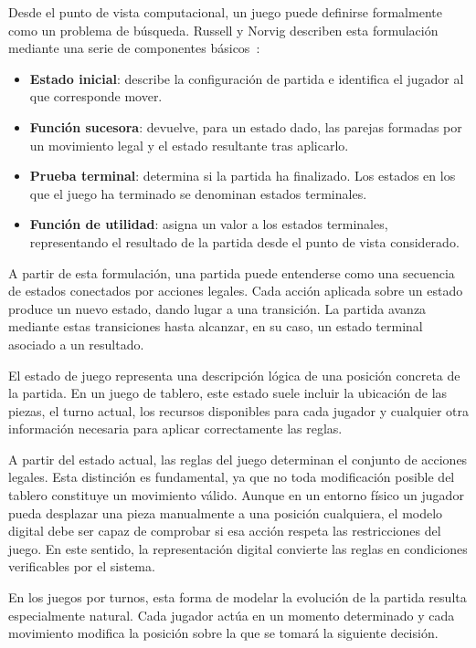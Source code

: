 Desde el punto de vista computacional, un juego puede definirse formalmente como un problema de búsqueda. Russell y Norvig describen esta formulación mediante una serie de componentes básicos~\cite{russell2020aima}:

\begin{itemize}
    \item \textbf{Estado inicial}: describe la configuración de partida e identifica el jugador al que corresponde mover.
    \item \textbf{Función sucesora}: devuelve, para un estado dado, las parejas formadas por un movimiento legal y el estado resultante tras aplicarlo.
    \item \textbf{Prueba terminal}: determina si la partida ha finalizado. Los estados en los que el juego ha terminado se denominan estados terminales.
    \item \textbf{Función de utilidad}: asigna un valor a los estados terminales, representando el resultado de la partida desde el punto de vista considerado.
\end{itemize}

A partir de esta formulación, una partida puede entenderse como una secuencia de estados conectados por acciones legales. Cada acción aplicada sobre un estado produce un nuevo estado, dando lugar a una transición. La partida avanza mediante estas transiciones hasta alcanzar, en su caso, un estado terminal asociado a un resultado.

El estado de juego representa una descripción lógica de una posición concreta de la partida. En un juego de tablero, este estado suele incluir la ubicación de las piezas, el turno actual, los recursos disponibles para cada jugador y cualquier otra información necesaria para aplicar correctamente las reglas.

A partir del estado actual, las reglas del juego determinan el conjunto de acciones legales. Esta distinción es fundamental, ya que no toda modificación posible del tablero constituye un movimiento válido. Aunque en un entorno físico un jugador pueda desplazar una pieza manualmente a una posición cualquiera, el modelo digital debe ser capaz de comprobar si esa acción respeta las restricciones del juego. En este sentido, la representación digital convierte las reglas en condiciones verificables por el sistema.

En los juegos por turnos, esta forma de modelar la evolución de la partida resulta especialmente natural. Cada jugador actúa en un momento determinado y cada movimiento modifica la posición sobre la que se tomará la siguiente decisión.


